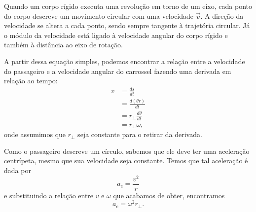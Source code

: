 \begin{marginfigure}
\centering
{}
\caption{Quando um corpo rígido executa uma revolução em torno de um eixo, cada ponto do corpo descreve um movimento circular com uma velocidade $\vec{v}$. A direção da velocidade se altera a cada ponto, sendo sempre tangente à trajetória circular. Já o módulo da velocidade está ligado à velocidade angular do corpo rígido e também à distância ao eixo de rotação. \label{Fig:RelVelocidades}}
\end{marginfigure}

A partir dessa equação simples, podemos encontrar a relação entre a velocidade do passageiro e a velocidade angular do carrossel fazendo uma derivada em relação ao tempo:
\begin{align}
	v &= \frac{ds}{dt} \\
	&= \frac{d(\theta r)}{dt} \\
	&= r_\perp\frac{d\theta}{dt} \\
	&= r_\perp\omega,
\end{align}
%
onde assumimos que $r_\perp$ seja constante para o retirar da derivada.

Como o passageiro descreve um círculo, sabemos que ele deve ter uma aceleração centrípeta, mesmo que sua velocidade seja constante. Temos que tal aceleração é dada por
\begin{equation}
	a_c = \frac{v^2}{r}
\end{equation}
%
e substituindo a relação entre $v$ e $\omega$ que acabamos de obter, encontramos
\begin{equation}
	a_c = \omega^2 r_\perp.
\end{equation}

